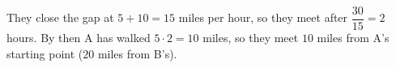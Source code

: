 They close the gap at $5+10=15$ miles per hour, so they meet after $\dfrac{30}{15}=\boxed{2}$ hours. By then A has walked $5\cdot2=10$ miles, so they meet $\boxed{10}$ miles from A's starting point ($20$ miles from B's).
